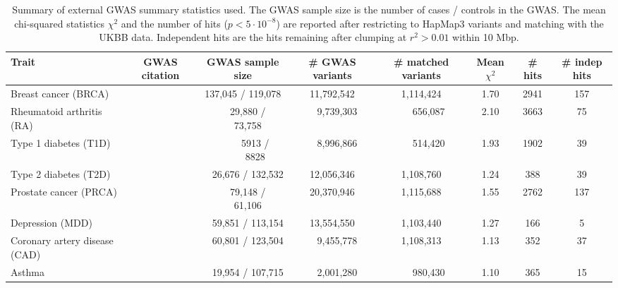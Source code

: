 \documentclass{bioinfo}
\begin{document}
\begin{methods}
\begin{table*}[htpb]
	\centering
	\begin{tabular}{|l||c|c|c||c|c|c|c|}
		\hline
		Trait & GWAS citation & GWAS sample size & \# GWAS variants & \# matched variants & Mean $\chi^2$ & \# hits & \# indep hits \\
		\hline
		Breast cancer (BRCA) & \cite{michailidou2017association} & 137,045 / 119,078 & 11,792,542 & 1,114,424 & 1.70 & 2941 & 157 \\
		Rheumatoid arthritis (RA) & \cite{okada2014genetics} & ~~29,880 / ~~73,758 & ~~9,739,303 & ~~~656,087 & 2.10 & 3663 & 75 \\
		Type 1 diabetes (T1D) & \cite{censin2017childhood} & ~~~~~5913 / ~~~~~8828  & ~~8,996,866 & ~~~514,420 & 1.93 & 1902 & 39 \\
		Type 2 diabetes (T2D) & \cite{scott2017expanded} & ~~26,676 / 132,532 & 12,056,346 & 1,108,760 & 1.24 & 388 & 39 \\
		Prostate cancer (PRCA) & \cite{schumacher2018association} & ~~79,148 / ~~61,106 & 20,370,946 & 1,115,688 & 1.55 & 2762 & 137 \\
		Depression (MDD) & \cite{wray2018genome} & ~~59,851 / 113,154 & 13,554,550 & 1,103,440 & 1.27 & 166 & 5 \\
		Coronary artery disease (CAD) & \cite{nikpay2015comprehensive} & ~~60,801 / 123,504 & ~~9,455,778 & 1,108,313 & 1.13 & 352 & 37 \\
		Asthma & \cite{demenais2018multiancestry} & ~~19,954 / 107,715 & ~~2,001,280 & ~~~980,430 & 1.10 & 365 & 15 \\
		\hline
	\end{tabular}
	\caption{Summary of external GWAS summary statistics used. The GWAS sample size is the number of cases / controls in the GWAS. The mean chi-squared statistics $\chi^2$ and the number of hits ($p < 5 \cdot 10^{-8}$) are reported after restricting to HapMap3 variants and matching with the UKBB data. Independent hits are the hits remaining after clumping at $r^2 > 0.01$ within 10 Mbp. \label{tab:sumstats}}
\end{table*}


\end{methods}
\end{document}
